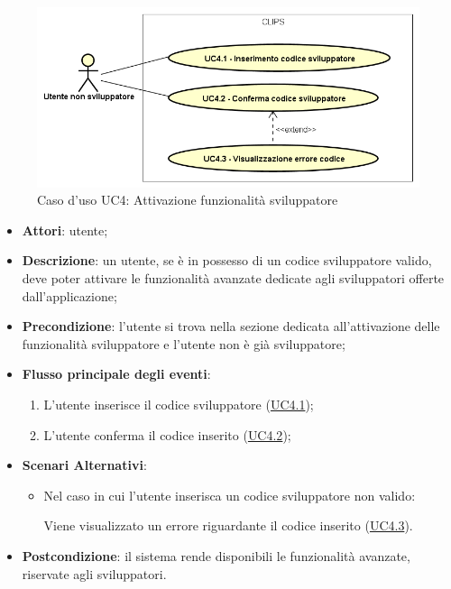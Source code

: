 \documentclass[../AnalisiDeiRequisiti.tex]{subfiles}
\begin{document}
        \begin{figure}[!h]
            \centering
            \includegraphics[scale=0.95, width=\textwidth]{img/UC4.png}
            \caption{Caso d'uso UC4: Attivazione funzionalità sviluppatore}\label{fig:UC4} 
        \end{figure}
\begin{itemize}
\item \textbf{Attori}: utente;
\item \textbf{Descrizione}: un utente, se è in possesso di un codice sviluppatore valido, deve poter attivare le funzionalità avanzate dedicate agli sviluppatori offerte dall'applicazione; 
      \item \textbf{Precondizione}: l'utente si trova nella sezione dedicata all'attivazione delle funzionalità sviluppatore e l'utente non è già sviluppatore;

        \item \textbf{Flusso principale degli eventi}:
          \begin{enumerate}
          \item L'utente inserisce il codice sviluppatore (\hyperlink{UC4.1}{UC4.1});
          \item L'utente conferma il codice inserito (\hyperlink{UC4.2}{UC4.2});

      \end{enumerate}
    \item \textbf{Scenari Alternativi}:
    	\begin{itemize}
    		\item Nel caso in cui l'utente inserisca un codice sviluppatore non valido:
    		\begin{enumerate}
    			Viene visualizzato un errore riguardante il codice inserito (\hyperlink{UC4.3}{UC4.3}).
    		\end{enumerate}
    	\end{itemize}

    \item \textbf{Postcondizione}: il sistema rende disponibili le funzionalità avanzate, riservate agli sviluppatori.
  \end{itemize}
\hypertarget{UC4.1}{}
\end{document}
